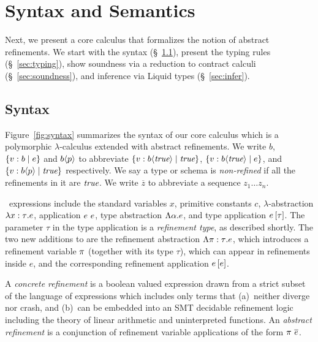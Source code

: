 \section{Syntax and Semantics}\label{sec:check}


Next, we present a core calculus \corelan that formalizes the notion
of abstract refinements. We start with the syntax (\S~\ref{sec:syntax}),
present the typing rules (\S~\ref{sec:typing}), show soundness 
via a reduction to contract calculi \cite{Knowles10,Greenberg11}
(\S~\ref{sec:soundness}), and inference via Liquid types (\S~\ref{sec:infer}).

\subsection{Syntax}\label{sec:syntax}

Figure~\ref{fig:syntax} summarizes the syntax of our core 
calculus \corelan which is a polymorphic $\lambda$-calculus 
extended with abstract refinements. 
%
We write 
$b$, 
$\left\lbrace v : b\mid e\right\rbrace$ and 
${b \langle p \rangle}$ 
to abbreviate 
$\left\lbrace v : {b \langle \textit{true} \rangle}\mid \textit{true}\right\rbrace$, 
$\left\lbrace v : {b \langle \textit{true} \rangle}\mid e\right\rbrace$, and
$\left\lbrace v : {b \langle p \rangle}\mid \textit{true}\right\rbrace$ respectively. 
We say a type or schema is \emph{non-refined} if all the 
refinements in it are $\textit{true}$. We write $\overline{z}$ 
to abbreviate a sequence $z_1 \ldots z_n$.


\corelan\ expressions include the standard variables $x$, 
primitive constants $c$, $\lambda$-abstraction $\lambda {x:\tau}. e$,
application ${e} \ {e}$, type abstraction $\Lambda \alpha . e$,
and type application ${e} \left[ {\tau}\right]$. The parameter $\tau$ in 
the type application is a \emph{refinement type}, as described shortly.
The two new additions to \corelan are the refinement abstraction
$\Lambda {\pi:\tau} . e$, which introduces a refinement variable 
$\pi$ (together with its type $\tau$), which can appear in refinements
inside $e$, and the corresponding refinement application ${e} \left[ e\right]$.
%

A \emph{concrete refinement}  is a boolean valued expression  
drawn from a strict subset of the language of expressions which
includes only terms that 
(a)~neither diverge nor crash, and 
(b)~can be embedded into an SMT decidable refinement logic including 
the theory of linear arithmetic and uninterpreted functions.
%
An \emph{abstract refinement} \areft is a conjunction of refinement
variable applications of the form ${\pi \ \overline{e}}$.

